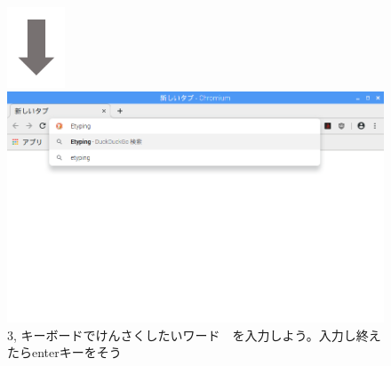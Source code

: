 \documentclass[a4paper,12pt]{jarticle}
\begin{document}
\begin{figure}[t]
  \hfill\begin{minipage}{0.45\textwidth}
    {\centering
      \includegraphics[width=1.707cm]{textbook-img074.png}
    }\\
    \includegraphics[width=\linewidth]{textbook-img072.png}
    3,
    キーボードでけんさくしたいワード　を入力しよう。入力し終えたらenterキーをそう
  \end{minipage}

  \vspace{70mm}

\end{figure}
\clearpage
\end{document}
